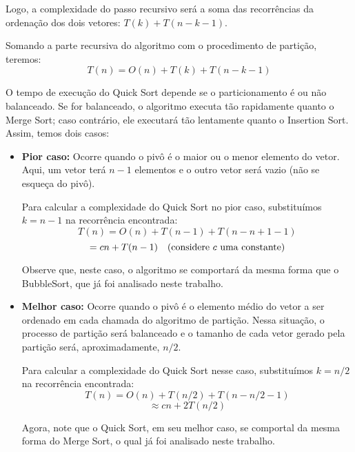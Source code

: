Logo, a complexidade do passo recursivo será a soma das recorrências da ordenação dos dois vetores: \( T(k) + T(n - k - 1) \).

Somando a parte recursiva do algoritmo com o procedimento de partição, teremos:
\[
T(n) = O(n) + T(k) + T(n - k - 1)
\]

O tempo de execução do Quick Sort depende se o particionamento é ou não balanceado. Se for balanceado, o algoritmo executa tão rapidamente quanto o Merge Sort; caso contrário, ele executará tão lentamente quanto o Insertion Sort. Assim, temos dois casos:

    \begin{itemize}
        \item \textbf{Pior caso:} Ocorre quando o pivô é o maior ou o menor elemento do vetor. Aqui, um vetor terá \( n-1 \) elementos e o outro vetor será vazio (não se esqueça do pivô).
    
    Para calcular a complexidade do Quick Sort no pior caso, substituímos \( k = n - 1 \) na recorrência encontrada:
    \[
    T(n) = O(n) + T(n-1) + T(n - n + 1 - 1)
    \]
    \[
    = cn + T(n-1) \quad \text{(considere \( c \) uma constante)}
    \]

    Observe que, neste caso, o algoritmo se comportará da mesma forma que o BubbleSort, que já foi analisado neste trabalho.

\item \textbf{Melhor caso:} Ocorre quando o pivô é o elemento médio do vetor a ser ordenado em cada chamada do algoritmo de partição. Nessa situação, o processo de partição será balanceado e o tamanho de cada vetor gerado pela partição será, aproximadamente, \( n/2 \).
    
    Para calcular a complexidade do Quick Sort nesse caso, substituímos \( k = n/2 \) na recorrência encontrada:
    \[
    T(n) = O(n) + T(n/2) + T(n - n/2 - 1)
    \]
    \[
    \approx cn + 2T(n/2)
    \]
    
        Agora, note que o Quick Sort, em seu melhor caso, se comportal da mesma forma do Merge Sort, o qual já foi analisado neste trabalho.

    \end{itemize}



